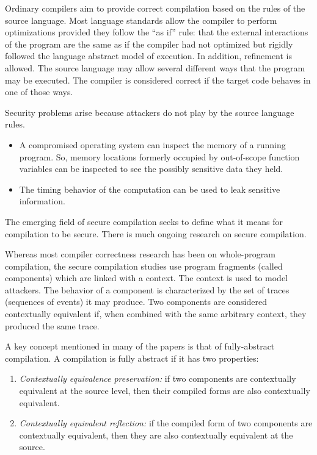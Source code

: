 Ordinary compilers aim to provide correct compilation based on the rules of the source language. Most language standards allow the compiler to perform optimizations provided they follow the ``as if'' rule: that the external interactions of the program are the same as if the compiler had not optimized but rigidly followed the language abstract model of execution. In addition, refinement is allowed. The source language may allow several different ways that the program may be executed. The compiler is considered correct if the target code behaves in one of those ways.

Security problems arise because attackers do not play by the source language rules.\autocites{20210614:sidhpurwala}{20210614:dsilva}
\begin{itemize}
	\item A compromised operating system can inspect the memory of a running program. So, memory locations formerly occupied by out-of-scope function variables can be inspected to see the possibly sensitive data they held.
	\item The timing behavior of the computation can be used to leak sensitive information.
\end{itemize}

The emerging field of secure compilation seeks to define what it means for compilation to be secure.\autocites{20210614:busi}{20210614:patrignani} There is much ongoing research on secure compilation.

Whereas most compiler correctness research has been on whole-program compilation, the secure compilation studies use program fragments (called components) which are linked with a context. The context is used to model attackers. The behavior of a component is characterized by the set of traces (sequences of events) it may produce. Two components are considered contextually equivalent if, when combined with the same arbitrary context, they produced the same trace. 

A key concept mentioned in many of the papers is that of fully-abstract compilation. A compilation is fully abstract if it has two properties:
\begin{enumerate}
	\item \textit{Contextually equivalence preservation:} if two components are contextually equivalent at the source level, then their compiled forms are also contextually equivalent.
	\item \textit{Contextually equivalent reflection:} if the compiled form of two components are contextually equivalent, then they are also contextually equivalent at the source.
\end{enumerate}

